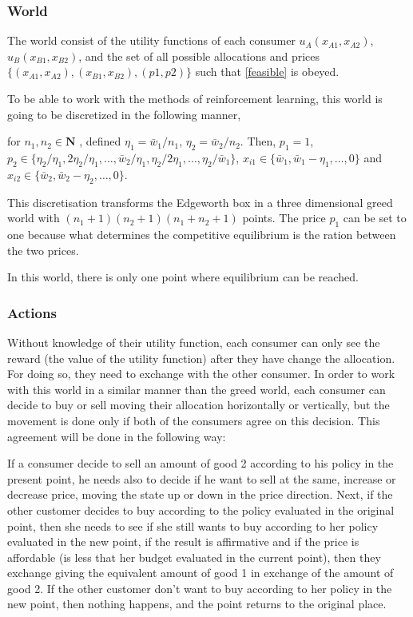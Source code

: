 \documentclass{article}
\begin{document}
\subsubsection*{World}
The world consist of the utility functions of each consumer $u_A(x_{A1},x_{A2})$,\\ $u_B(x_{B1},x_{B2})$, and the set of all possible allocations and prices \\$\{ (x_{A1},x_{A2}),(x_{B1},x_{B2}),(p1,p2) \}$ such that \cref{feasible} is obeyed. 

To be able to work with the methods of reinforcement learning, this world is going to be discretized in the following manner,

for $n_1,n_2 \in \mathbf{N}$ , defined $\eta_1 = \bar{w}_1/n_1$,  $\eta_2 = \bar{w}_2/n_2$. Then, $p_1 = 1$, $p_2 \in \{\eta_2/\eta_1,2\eta_2/\eta_1, \hdots , \bar{w}_2/\eta_1 , \eta_2/2\eta_1,\hdots,\eta_2/\bar{w}_1 \}$, $x_{i1} \in \{\bar{w}_1,\bar{w}_1 - \eta_1 ,\hdots,0 \}$ and $x_{i2} \in \{\bar{w}_2,\bar{w}_2 - \eta_2 ,\hdots,0 \}$.

This discretisation transforms the Edgeworth box in a three dimensional greed world with $(n_1+1)(n_2+1)(n_1+n_2 + 1)$ points. The price $p_1$ can be set to one because what determines the competitive equilibrium is the ration between the two prices.

In this world, there is only one point where equilibrium can be reached. 

\subsubsection*{Actions}
Without knowledge of their utility function, each consumer can only see the reward (the value of the utility function) after they have change the allocation. For doing so, they need to exchange with the other consumer. In order to work with this world in a similar manner than the greed world, each consumer can decide to buy or sell moving their allocation horizontally or vertically, but the movement is done only if both of the consumers agree on this decision. This agreement will be done in the following way:

If a consumer decide to sell an amount of good 2 according to his policy in the present point, he needs also to decide if he want to sell at the same, increase or decrease price, moving the state up or down in the price direction. Next, if the other customer decides to buy according to the policy evaluated in the original point, then she needs to see if she still wants to buy according to her policy evaluated in the new point, if the result is affirmative and if the price is affordable (is less that her budget evaluated in the current point), then they exchange giving the equivalent amount of good 1 in exchange of the amount of good 2. If the other customer don't want to buy according to her policy in the new point, then nothing happens, and the point returns to the original place. 
\end{document}
